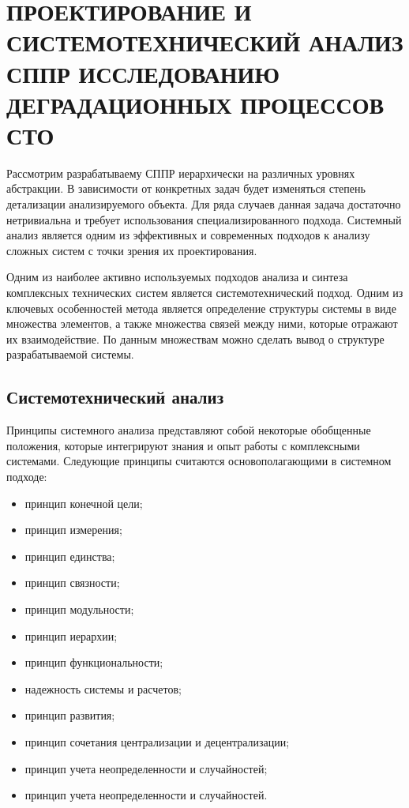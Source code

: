 \section{ПРОЕКТИРОВАНИЕ И СИСТЕМОТЕХНИЧЕСКИЙ АНАЛИЗ СППР ИССЛЕДОВАНИЮ ДЕГРАДАЦИОННЫХ ПРОЦЕССОВ СТО}

Рассмотрим разрабатываему СППР иерархически на различных уровнях абстракции. 
В зависимости от конкретных задач будет изменяться степень детализации анализируемого объекта. 
Для ряда случаев данная задача достаточно нетривиальна и требует использования специализированного подхода. 
Системный анализ является одним из эффективных и современных подходов к анализу сложных систем с точки зрения их проектирования.

Одним из наиболее активно используемых подходов анализа и синтеза комплексных технических систем является системотехнический подход. 
Одним из ключевых особенностей метода является определение структуры системы в виде множества элементов, а также множества связей между ними, которые отражают их взаимодействие. 
По данным множествам можно сделать вывод о структуре разрабатываемой системы.

\subsection{Системотехнический анализ}

Принципы системного анализа представляют собой некоторые обобщенные положения, которые интегрируют знания и опыт работы с комплексными системами. 
Следующие принципы считаются основополагающими в системном подходе: 

\begin{itemize}
    \item принцип конечной цели;
    \item принцип измерения;
    \item принцип единства;
    \item принцип связности;
    \item принцип модульности;
    \item принцип иерархии;
    \item принцип функциональности;
    \item надежность системы и расчетов;
    \item принцип развития;
    \item принцип сочетания централизации и децентрализации;
    \item принцип учета неопределенности и случайностей;
    \item принцип учета неопределенности и случайностей.
\end{itemize}

